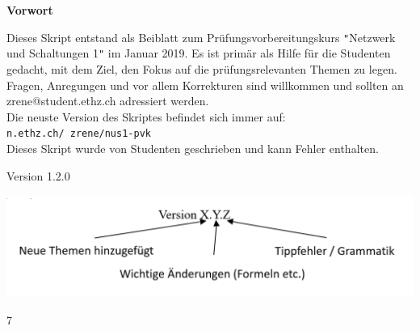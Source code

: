 




	\begin{center}
		\LARGE\textbf{Vorwort}
	\end{center}
	Dieses Skript entstand als Beiblatt zum Prüfungsvorbereitungskurs \texttt{"}Netzwerk und Schaltungen 1\texttt{"} im Januar 2019.
	Es ist primär als Hilfe für die Studenten gedacht, mit dem Ziel, den Fokus auf die prüfungsrelevanten Themen zu legen.
	Fragen, Anregungen und vor allem Korrekturen sind willkommen und sollten an zrene@student.ethz.ch adressiert werden. \\
	Die neuste Version des Skriptes befindet sich immer auf: \texttt{n.ethz.ch/~zrene/nus1-pvk}
	\\
	Dieses Skript wurde von Studenten geschrieben und kann Fehler enthalten.
	\begin{center}
		Version 1.2.0
	\end{center}
	\begin{center}
		\hspace{1cm}
		\includegraphics[scale=0.48]{img/version.png}
	\end{center}


	\cleardoublepage

	\tableofcontents                %

	\newpage


	 
	 \newpage
	 

	 
	 \newpage
	 
	 
	 
	 \newpage
	 




7
